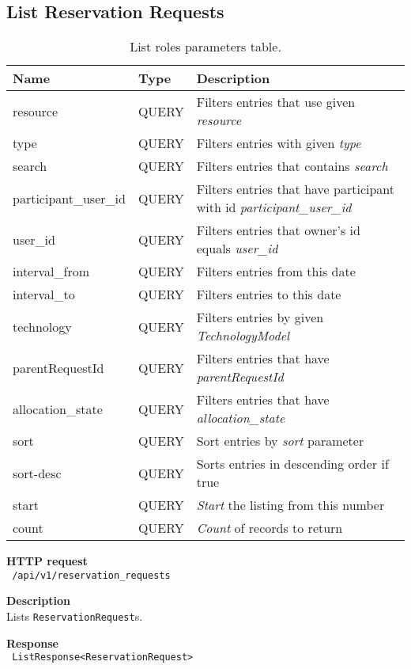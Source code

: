 \subsection{List Reservation Requests}
\begin{table}[ht!]
    \begin{tabularx}{\textwidth}{llX}
        \toprule
        Name & Type & Description \\
        \midrule
        resource & QUERY & Filters entries that use given \emph{resource} \\
        type & QUERY & Filters entries with given \emph{type} \\
        search & QUERY & Filters entries that contains \emph{search} \\
        participant\_user\_id & QUERY &  Filters entries that have participant with id \emph{participant\_user\_id} \\
        user\_id & QUERY & Filters entries that owner's id equals \emph{user\_id} \\
        interval\_from & QUERY & Filters entries from this date \\  
        interval\_to & QUERY & Filters entries to this date \\
        technology & QUERY & Filters entries by given \emph{TechnologyModel} \\
        parentRequestId & QUERY & Filters entries that have \emph{parentRequestId} \\
        allocation\_state & QUERY & Filters entries that have \emph{allocation\_state} \\
        sort & QUERY & Sort entries by \emph{sort} parameter \\
        sort-desc & QUERY & Sorts entries in descending order if true \\
        start & QUERY & \emph{Start} the listing from this number \\  
        count & QUERY & \emph{Count} of records to return
        \end{tabularx}
    \caption{List roles parameters table.}
\end{table}
\begin{description}
    \item \textbf{HTTP request}\\
        \texttt{\text{[GET]} /api/v1/reservation\_requests}
    \item \textbf{Description}\\
        Lists \texttt{ReservationRequest}s.
    \item \textbf{Response}\\
        \texttt{\text{[200 OK]} ListResponse<ReservationRequest>}
\end{description}

